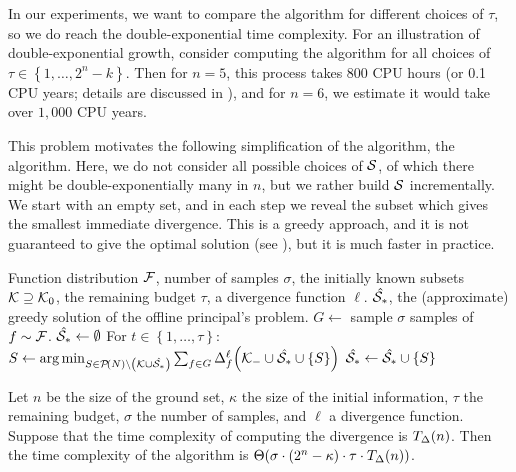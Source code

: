 In our experiments, we want to compare the \algFO{} algorithm for different choices of $ \tau $, so we do reach the double-exponential time complexity.
For an illustration of double-exponential growth, consider computing the \algFO{} algorithm for all choices of $ \tau \in \left\{ 1, \ldots, 2^n-k \right\} $.
Then for $ n=5 $, this process takes $ 800 $ CPU hours (or 0.1 CPU years; details are discussed in ), and for $ n=6 $, we estimate it would take over $ 1,000 $ CPU years.

This problem motivates the following simplification of the \algFO{} algorithm, the \algFG{} algorithm.
Here, we do not consider all possible choices of $ \mathcal{S} $, of which there might be double-exponentially many in $ n $, but we rather build $ \mathcal{S} $ incrementally.
We start with an empty set, and in each step we reveal the subset which gives the smallest immediate divergence.
This is a greedy approach, and it is not guaranteed to give the optimal solution (see ), but it is much faster in practice.

\begin{algor}{\label{alg:fg}\algFG{}}{Function distribution $ \mathcal{F} $, number of samples $ \sigma $, the initially known subsets $ \mathcal{K} \supseteq \mathcal{K}_0 $, the remaining budget $ \tau $, a divergence function $ \ell $.}
  {$ \hat{\mathcal{S}_*} $, the (approximate) greedy solution of the offline principal's problem.}
  \State $ G \gets $ sample $ \sigma $ samples of $ f \sim \mathcal{F} $.
  \State $ \hat{\mathcal{S}_*} \gets \emptyset $
  \Indent For $ t \in \left\{ 1, \dots, \tau \right\} $:
  \State $ S \gets \operatorname*{arg\,min}_{S \in \mathcal{P}\!\left(N\right) \setminus \left( \mathcal{K} \cup \hat{\mathcal{S}_*} \right)} \sum_{f \in G} \Delta_{f}^{\ell}\!\left(\mathcal{K}_- \cup \hat{\mathcal{S}_*} \cup \left\{ S \right\}\right) $
  \State $ \hat{\mathcal{S}_*} \gets \hat{\mathcal{S}_*} \cup \left\{ S \right\} $
  \EndIndent
  
\end{algor}

\begin{prop}
  Let $ n $ be the size of the ground set, $ \kappa $ the size of the initial information, $ \tau $ the remaining budget, $ \sigma $ the number of samples, and $ \ell $ a divergence function.
  Suppose that the time complexity of computing the divergence is $ T_\Delta\!\left(n\right) $.
  Then the time complexity of the \algFG{} algorithm is $ \Theta\!\left(\sigma \cdot \left( 2^n-\kappa \right)\cdot\tau \cdot T_\Delta\!\left(n\right)\right) $.
\end{prop}

